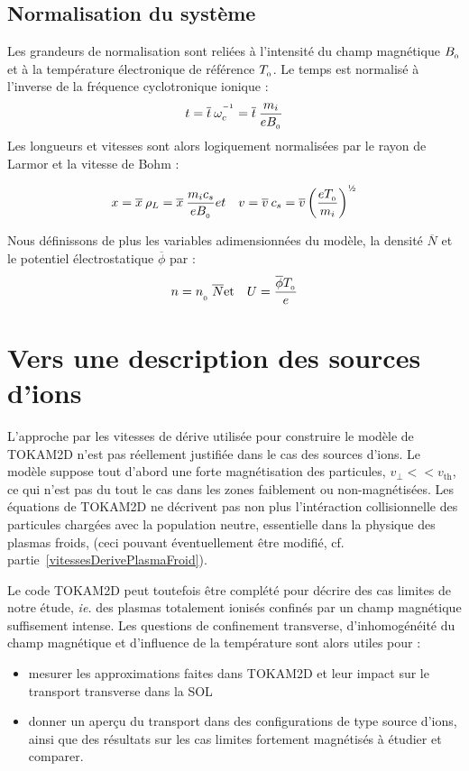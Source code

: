 \subsection{Normalisation du système}
Les grandeurs de normalisation sont reliées à l'intensité du champ magnétique
$B_{_{0}}$ et à la température électronique de référence $T_{_{0}}$. Le
temps est normalisé à l'inverse de la fréquence cyclotronique ionique :
\begin{equation}
t = \overline{t}\:\omega_c^{^{-1}} =
\overline{t}\:\frac{m_i}{eB_{_{0}}}
\end{equation}
Les longueurs et vitesses sont alors logiquement normalisées par le rayon de
Larmor et la vitesse de Bohm :

\begin{eqnarray}
x = \overline{x}\:\rho_L =
\overline{x}\:\frac{m_ic_s}{eB\indice{0}} &
et &
v=\overline{v}\:c_s=\overline{v}\left(\frac{eT\indice{0}}{m_i}\right)^{\text{\textonehalf}}
\end{eqnarray}

Nous définissons de plus les variables adimensionnées du modèle, la densité
$\overline{N}$ et le potentiel électrostatique $\overline \phi$ par :
\begin{eqnarray}
n = n_{_{_{0}}}\:\overline{N} & \text{et} & U=\frac{\overline
{\phi}T_{_{0}}}{e}
\end{eqnarray}
\vfill
\section{Vers une description des sources d'ions}
L'approche par les vitesses de dérive utilisée pour construire le modèle de TOKAM2D n'est pas 
réellement justifiée dans le cas des sources d'ions. Le modèle suppose tout d'abord une
forte magnétisation des particules, $v_\perp<<v_\text{th}$, ce qui n'est pas du tout le cas dans 
les zones faiblement ou non-magnétisées. Les équations de TOKAM2D ne décrivent pas non plus l'intéraction
collisionnelle des particules chargées avec la population neutre, essentielle dans la physique des plasmas froids,
(ceci pouvant éventuellement être modifié, cf.
partie~\ref{vitessesDerivePlasmaFroid}).

Le code TOKAM2D peut toutefois être complété pour décrire des cas limites de notre étude, \emph{ie.} des plasmas totalement ionisés
confinés par un champ magnétique suffisement intense. Les questions de confinement transverse, d'inhomogénéité du champ 
magnétique et d'influence de la température sont alors utiles pour :
\begin{itemize}
	\item mesurer les approximations faites dans TOKAM2D et leur impact sur le transport transverse dans la SOL
	\item donner un aperçu du transport dans des configurations de type source d'ions, ainsi que des résultats sur les 
	cas limites fortement magnétisés à étudier et comparer.
\end{itemize}
